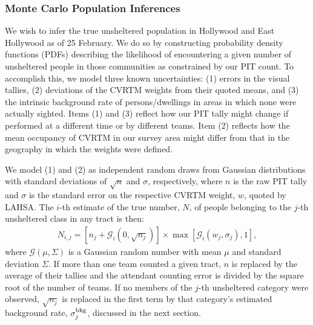 \documentclass[11pt,twocolumn]{article}
\def\Count{count}
\def\resp{respectively}
\begin{document}

%
%

\subsubsection{Monte Carlo Population Inferences}
\label{sec:mc}

We wish to infer the true unsheltered population in Hollywood and East Hollywood as of 25 February. 
We do so by constructing probability density functions (PDFs) describing the likelihood of encountering 
a given number of unsheltered people in those communities as constrained by our PIT \Count. 
To accomplish this, we model three known uncertainties: (1) errors in the visual tallies, (2) deviations 
of the CVRTM weights from their quoted means, and (3) the intrinsic background rate of persons/dwellings
in areas in which none were actually sighted. Items (1) and (3) reflect how our PIT tally might change
if performed at a different time or by different teams. Item (2) reflects how the mean 
occupancy of CVRTM in our survey area might differ from that in the geography in which the weights 
were defined.

We model (1) and (2) as independent random draws from Gaussian distributions with standard 
deviations of $\sqrt{n}$ and $\sigma$, \resp, where $n$ is the raw PIT tally and $\sigma$ is the 
standard error on the respective CVRTM weight, $w$, quoted by LAHSA. The $i$-th 
estimate of the true number, $N$, of people belonging to the $j$-th unsheltered class in any tract is then:
\begin{multline}\label{eq:monte}
	N_{i,j} = \left[n_{j} + \mathcal{G}_{i}(0,\sqrt{n_{j}})\right]\times\max[\mathcal{G}_{i}(w_{j}, \sigma_{j}),1],
\end{multline}
where $\mathcal{G}(\mu,\Sigma)$ is a Gaussian random number with mean $\mu$ and standard deviation 
$\Sigma$. If more than one team counted a given tract, $n$ is replaced by the average of their tallies 
and the attendant counting error is divided by the square root of the number of teams. If no members
of the $j$-th unsheltered category were observed, $\sqrt{n_{j}}$ is replaced in the first term 
by that category's estimated background rate, $\sigma_{j}^{\rm bkg}$, discussed in the next section.%
\end{document}
